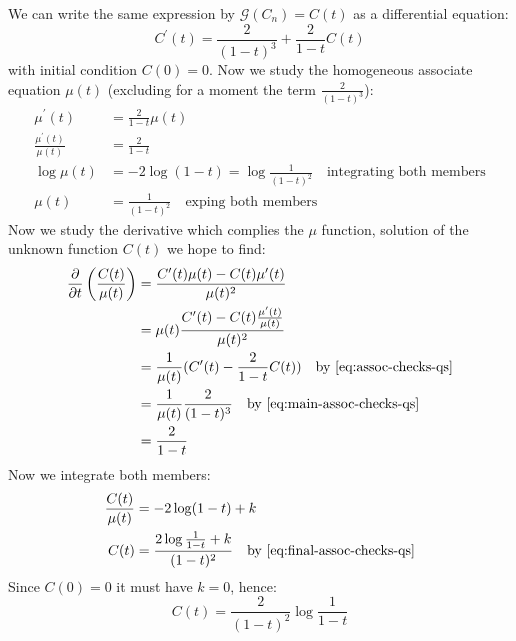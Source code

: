 We can write the same expression by $\mathcal{G} (C_n) = C(t)$ as a
differential equation:
\begin{equation}
  \label{eq:main-assoc-checks-qs}
  C^{\prime}(t) = \frac{2}{(1-t)^3} + \frac{2}{1-t} C(t)
\end{equation}
with initial condition $C(0) = 0$. Now we study the homogeneous
associate equation $\mu(t)$ (excluding for a moment the term $
\frac{2}{(1-t)^3}$):
\begin{eqnarray}
    \mu^{\prime} (t) &=  \frac{2}{1-t} \mu (t)\\
    \frac{\mu^{\prime}(t)}{\mu (t)} &= \frac{2}{1-t} \label{eq:assoc-checks-qs}\\
    \log\mu (t) &= -2\log (1-t) = \log \frac{1}{(1-t)^2} \quad \text{
      integrating both members} \\
    \label{eq:final-assoc-checks-qs}
    \mu (t) &= \frac{1}{(1-t)^2}\quad \text{
      exping both members}
\end{eqnarray}
Now we study the derivative which complies the $\mu$ function,
solution of the unknown function $C(t)$
we hope to find:
\begin{displaymath}
  \begin{split}
    \frac{\partial}{\partial t}\left( \frac{C(t)}{\mu (t)} \right) &=
    \frac{C^{\prime} (t)\mu (t) - C(t)\mu^{\prime} (t)}{\mu (t)^2} \\
    &= \mu (t)\frac{C^{\prime} (t) - C(t) \frac{\mu^{\prime} (t)}{\mu
        (t)} }{\mu (t)^2} \\
    &= \frac{1}{\mu (t)} (C^{\prime} (t) - \frac{2}{1-t}C(t) ) \quad
    \text{by \autoref{eq:assoc-checks-qs}}\\
    &= \frac{1}{\mu (t)}\frac{2}{(1-t)^3}\quad \text{by
      \autoref{eq:main-assoc-checks-qs}} \\
    &= \frac{2}{1-t}
  \end{split}
\end{displaymath}
Now we integrate both members:
\begin{displaymath}
  \begin{split}
    \frac{C(t)}{\mu (t)} &= -2\log (1-t) +k \\
    C(t) &= \frac{2\log{ \frac{1}{1-t} } + k}{(1-t)^2}\quad \text{by
      \autoref{eq:final-assoc-checks-qs}}
  \end{split}
\end{displaymath}
Since $C(0)=0$ it must have $k=0$, hence:
\begin{equation}
  C(t) = \frac{2}{(1-t)^2}\log{ \frac{1}{1-t} }
\end{equation}

